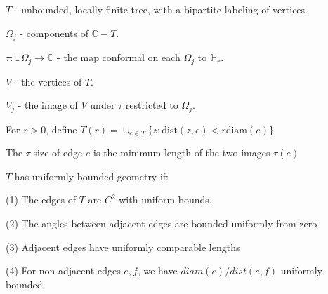 \documentclass{beamer}
\begin{document}
\begin{frame}

$T$ - unbounded, locally finite tree, with a bipartite labeling of vertices.

$\Omega_j$ - components of $\mathbb{C}-T$.

$\tau: \cup \Omega_j \rightarrow \mathbb{C}$ - the map conformal on each $\Omega_j$ to $\mathbb{H}_r$.

$V$ - the vertices of $T$. 

$V_j$ - the image of $V$ under $\tau$ restricted to $\Omega_j$.

For $r > 0$, define $T(r) = \cup_{e\in T} \{z : \textrm{dist}(z,e) < r\textrm{diam}(e) \}$

The $\tau$-size of edge $e$ is the minimum length of the two images $\tau(e)$

\vspace{5mm}

$T$ has uniformly bounded geometry if: 

\hspace{5mm} (1) The edges of $T$ are $C^2$ with uniform bounds. 

\hspace{5mm} (2) The angles between adjacent edges are bounded uniformly from zero

\hspace{5mm} (3) Adjacent edges have uniformly comparable lengths

\hspace{5mm} (4) For non-adjacent edges $e, f$, we have $diam(e)/dist(e,f)$ uniformly bounded.

\end{frame}
\end{document}
